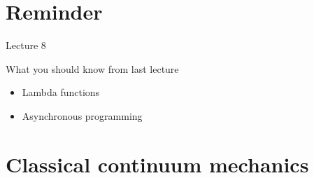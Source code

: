 \documentclass[\classoption]{beamer}
\title{\coursename}
\subtitle{Lecture 8: Introduction to bond-based peridynamics}
\date {
 \tiny \url{\courseurl}
\vspace{2cm}
\doclicenseThis  
  
}
\begin{document}
 {
    \frame {
        \titlepage
    }
}

\frame{

\tableofcontents

}


\section{Reminder}
\begin{frame}{Lecture 8}
\begin{block}{What you should know from last lecture}
\begin{itemize}
\item Lambda functions
\item Asynchronous programming
\end{itemize}
\end{block}
\end{frame}


\section{Classical continuum mechanics}
\end{document}
